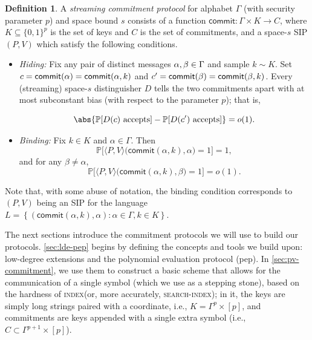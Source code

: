 \documentclass[10pt,a4paper]{article}
\theoremstyle{definition}
\newtheorem{definition}[theorem]{Definition}
\renewcommand{\P}{\mathbb P}
\renewcommand{\set}[1]{\left\{#1\right\}}
\newcommand{\bitset}{\{0,1\}}
\newcommand{\indexproblem}{\normalfont\textsc{index}\xspace}
\newcommand{\searchindex}{\normalfont\textsc{search-index}\xspace}
\newcommand{\pepprotocol}{\textsf{pep}\xspace}
\newcommand{\pcommitlength}{p}
\newcommand{\alphabet}{\Gamma}
\def\symbol#1{
    \ifnum#1=1
        \alpha
    \else
    \ifnum#1=2
        \beta
    \else
    \ifnum#1=3
        \gamma
    \fi\fi\fi
}
\begin{document}
\begin{definition}
\label{def:commitment}
A \emph{streaming commitment protocol} for alphabet $\alphabet$ (with security parameter $\pcommitlength$) and space bound $s$ consists of a function $\textsf{commit}: \alphabet \times K \to C$, where $K \subseteq \bitset^\pcommitlength$ is the set of keys and $C$ is the set of commitments, and a space-$s$ SIP $(P,V)$ which satisfy the following conditions.

\begin{itemize}
    \item \emph{Hiding:} Fix any pair of distinct messages $\symbol1, \symbol2 \in\alphabet$ and sample $k \sim K$. Set $c = \textsf{commit}(\symbol1) = \textsf{commit}(\symbol1, k)$ and $c' = \textsf{commit}(\symbol2) = \textsf{commit}(\symbol2, k)$. Every (streaming) space-$s$ distinguisher $D$ tells the two commitments apart with at most subconstant bias (with respect to the parameter $\pcommitlength$); that is,

    \begin{equation*}
        \abs{\P[D(c) \text{ accepts}] - \P[D(c') \text{ accepts}]} = o(1).
    \end{equation*}

    \item \emph{Binding:} Fix $k \in K$ and $\alpha \in \alphabet$. Then
    \begin{equation*}
        \P\big[\langle P, V\rangle\big(\textsf{commit}(\alpha, k), \alpha\big) = 1\big] = 1,
    \end{equation*}
    and for any $\beta \neq \alpha$,
    \begin{equation*}
        \P\big[\langle P, V\rangle\big(\textsf{commit}(\alpha, k), \beta\big) = 1\big] = o(1).
    \end{equation*}
\end{itemize}
\end{definition}

Note that, with some abuse of notation, the binding condition corresponds to $(P,V)$ being an SIP for the language $L = \set{(\textsf{commit}(\alpha, k), \alpha) : \alpha \in \alphabet, k \in K}$.

The next sections introduce the commitment protocols we will use to build our protocols. \cref{sec:lde-pep} begins by defining the concepts and tools we build upon: low-degree extensions and the polynomial evaluation protocol (\pepprotocol). In \cref{sec:pv-commitment}, we use them to construct a basic scheme that allows for the communication of a single symbol (which we use as a stepping stone), based on the hardness of \indexproblem (or, more accurately, \searchindex); in it, the keys are simply long strings paired with a coordinate, i.e., $K = \alphabet^\pcommitlength \times [\pcommitlength]$, and commitments are keys appended with a single extra symbol (i.e., $C \subset \alphabet^{\pcommitlength + 1} \times [\pcommitlength]$).
\end{document}

